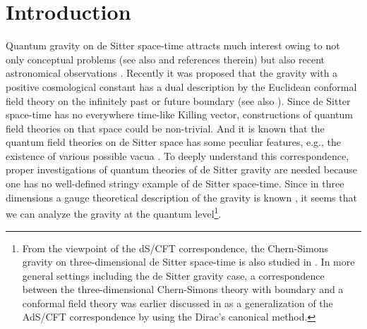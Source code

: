 \documentclass[a4paper,11pt]{article}
\begin{document}
\section{Introduction}
Quantum gravity on de Sitter space-time attracts much interest
owing to not only conceptual problems \cite{Witten1} (see also
\cite{Bousso} and references therein) 
but also recent astronomical observations \cite{Riess, Perlmutter}.  
Recently it was proposed that the gravity with a positive cosmological
constant has a dual description by the Euclidean conformal field theory 
on the infinitely past or future boundary \cite{Strominger} 
(see also \cite{SSV}).
Since de Sitter space-time has no everywhere time-like Killing
vector, constructions of quantum field theories on that space 
could be non-trivial.
And it is known that the quantum field theories on de Sitter space 
has some peculiar features, e.g., the existence of various possible
vacua \cite{SSV, BMS}. 
To deeply understand this correspondence, proper investigations of 
quantum theories of de Sitter gravity are needed because 
one has no well-defined stringy example of de Sitter space-time.
Since in three dimensions a gauge theoretical description of 
the gravity is known \cite{Townsend, Witten2}, 
it seems that we can analyze the gravity 
at the quantum level\footnote{From the viewpoint of the dS/CFT
correspondence, the Chern-Simons gravity on three-dimensional 
de Sitter space-time is also studied 
in \cite{Klemm1, BBM1, Cunha1, GKS, Klemm2, BBM2, Cunha2}.
In more general settings including the de Sitter gravity case, a
correspondence between the three-dimensional Chern-Simons theory with
boundary and a conformal field theory was earlier discussed in
\cite{Park2} as a generalization of the AdS/CFT correspondence by using
the Dirac's canonical method.}.  
\end{document}
